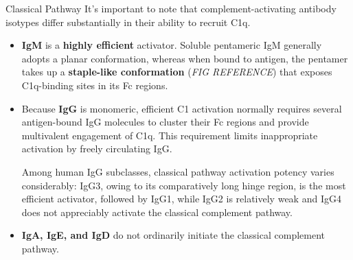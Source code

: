 \begin{core}[label=core:complement_classical]{Classical Pathway}
      It's important to note that complement-activating antibody isotypes differ substantially in their ability to recruit C1q.

      \begin{itemize}

        \item \textbf{IgM} is a \textbf{highly efficient} activator. Soluble pentameric IgM generally adopts a planar conformation, whereas when bound to antigen, the pentamer takes up a \textbf{staple-like conformation} (\textit{FIG REFERENCE}) that exposes C1q-binding sites in its Fc regions.


        \item Because \textbf{IgG} is monomeric, efficient C1 activation normally requires several antigen-bound IgG molecules to cluster their Fc regions and provide multivalent engagement of C1q. This requirement limits inappropriate activation by freely circulating IgG.

        Among human IgG subclasses, classical pathway activation potency varies considerably: IgG3, owing to its comparatively long hinge region, is the most efficient activator, followed by IgG1, while IgG2 is relatively weak and IgG4 does not appreciably activate the classical complement pathway.

        \item \textbf{IgA, IgE, and IgD} do not ordinarily initiate the classical complement pathway.

      \end{itemize}

    \end{core}

